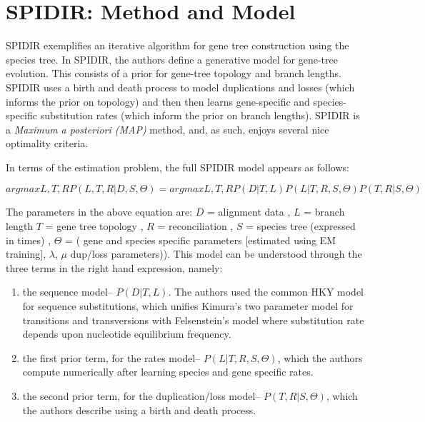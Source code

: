 \section{SPIDIR: Method and Model} 
SPIDIR exemplifies an iterative algorithm for gene tree construction
using the species tree. In SPIDIR, the authors define a generative
model for gene-tree evolution. This consists of a prior for gene-tree
topology and branch lengths. SPIDIR uses a birth and death process to
model duplications and losses (which informs the prior on topology)
and then then learns gene-specific and species-specific substitution
rates (which inform the prior on branch lengths). SPIDIR is a
\textit{Maximum a posteriori (MAP)} method, and, as such, enjoys
several nice optimality criteria.

In terms of the estimation problem, the full SPIDIR model appears as
follows:

$argmax L,T,R P(L,T,R|D,S,\Theta) = argmax L,T,R P(D|T,L)P(L|T,R,S,\Theta)P(T,R|S,\Theta)$ 

The parameters in the above equation are: $D$ = alignment data , $L$ =
branch length $T$ = gene tree topology , $R$ = reconciliation , $S$ =
species tree (expressed in times) , $\Theta$ = ( gene and species
specific parameters [estimated using EM training], $\lambda$, $\mu$
dup/loss parameters)). This model can be understood through the three
terms in the right hand expression, namely:

\begin{enumerate} 
\item the sequence model-- $P(D|T,L)$. The authors used the common HKY
  model for sequence substitutions, which unifies Kimura's two
  parameter model for transitions and transversions with Felsenstein's
  model where substitution rate depends upon nucleotide equilibrium
  frequency.
\item the first prior term, for the rates model-- $P(L|T,R,S,\Theta)$,
  which the authors compute numerically after learning species and
  gene specific rates.
\item the second prior term, for the duplication/loss model--
  $P(T,R|S,\Theta)$, which the authors describe using a birth and
  death process.
\end{enumerate} 

